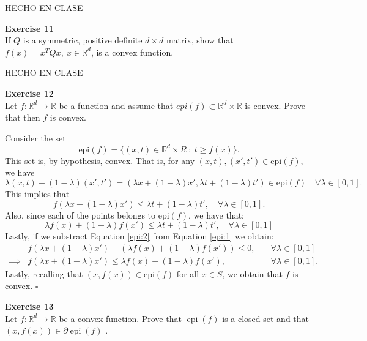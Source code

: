 \documentclass[11pt,table]{article}
\newcommand{\qed}{\hfill $\square$}
\newenvironment{problem}[2][Exercise]
    { \begin{mdframed}[backgroundcolor=gray!20] \textbf{#1 #2} \\}
    {  \end{mdframed}}
\newcommand\R{\mathbb R}
\begin{document}
HECHO EN CLASE

\begin{problem}{11}
If \( Q \) is a symmetric, positive definite \( d \times d \) matrix, show that \( f(x) = x^TQx, \ x \in \mathbb{R}^d \), is a convex function.
\end{problem}

HECHO EN CLASE

\begin{problem}{12}
Let \( f:\mathbb{R}^d \to \mathbb{R} \)  be a function and assume that \( epi(f) \subset \mathbb{R}^d \times \mathbb{R} \)  is convex. Prove that then \( f \)  is convex.

\end{problem}

Consider the set
\[
  \text{epi}(f) = \{(x,t)\in \R^d \times R \ : \ t \geq f(x)\}.
\]
This set is, by hypothesis, convex. That is, for any \((x,t),(x',t') \in \text{epi}(f)\), we have
\[
  \lambda(x,t) + (1-\lambda)(x',t')  = \left(\lambda x + (1-\lambda)x', \lambda t + (1-\lambda)t'\right) \in \text{epi}(f)\quad \forall \lambda \in [0,1].
\]
This implies that
\begin{equation}\label{epi:1}
  f(\lambda x + (1-\lambda)x') \leq \lambda t + (1-\lambda)t', \quad \forall \lambda \in [0,1].
\end{equation}
Also, since each of the points belongs to \(\text{epi}(f)\), we have that:
\begin{equation}\label{epi:2}
  \lambda f(x) + (1-\lambda)f(x') \leq \lambda t + (1-\lambda)t', \quad \forall \lambda \in [0,1]
\end{equation}
Lastly, if we substract Equation \eqref{epi:2} from Equation \eqref{epi:1} we obtain:
\begin{align*}
   & f(\lambda x + (1-\lambda)x')  - \left( \lambda f(x) + (1-\lambda)f(x')\right)  \leq 0, & \quad \forall \lambda \in [0,1]
  \\ \implies & f(\lambda x + (1-\lambda)x') \leq  \lambda f(x) + (1-\lambda)f(x'), &\quad \forall \lambda \in [0,1].
\end{align*}
Lastly, recalling that \((x,f(x)) \in \text{epi}(f)\) for all \(x \in S\), we obtain that \(f\) is convex. \qed \\


\begin{problem}{13}
Let \( f : \mathbb{R}^d \to \mathbb{R} \) be a convex function. Prove that \( \operatorname{epi}(f) \) is a closed set and that \( (x, f(x)) \in \partial \operatorname{epi}(f) \)  .
\end{problem}
\end{document}
